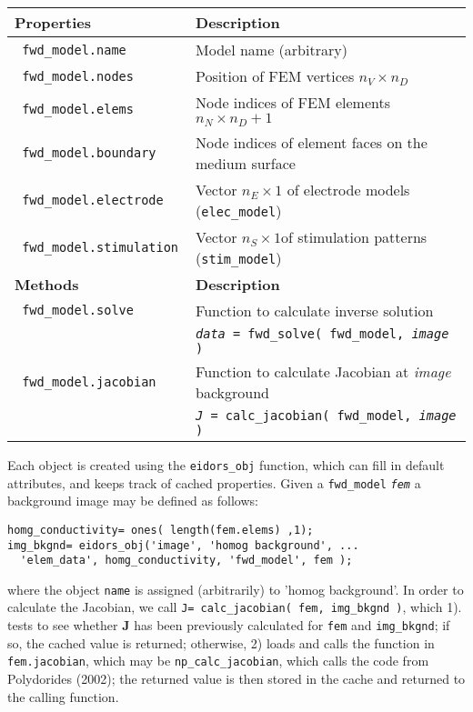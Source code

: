 \documentclass[12pt]{iopart}
\begin{document}
\begin{tabular}{ll}
{\bf Properties} & {\bf Description } \\
\hline
{\tt
        fwd\_model.name
} &
        Model name (arbitrary)
\\
{\tt
        fwd\_model.nodes
} &
        Position of FEM vertices
        $n_V{\times}n_D$
\\
{\tt
        fwd\_model.elems
} &
        Node indices of FEM elements
        $n_N{\times}n_D+1$
\\
{\tt
        fwd\_model.boundary
} &
        Node indices of element faces on the medium surface
\\
{\tt
        fwd\_model.electrode
} &
        Vector $n_E{\times}1$
           of electrode models ({\tt elec\_model})
\\
{\tt
        fwd\_model.stimulation
} &
         Vector $n_S{\times}1$of stimulation
            patterns ({\tt stim\_model})
\\
\hline
{\bf Methods} & {\bf Description } \\
\hline
{\tt
        fwd\_model.solve
} &
        Function to calculate inverse solution
\\ &
        {\tt {\em data} = fwd\_solve( fwd\_model, {\em image} )}
\\
{\tt
        fwd\_model.jacobian
} &
        Function to calculate Jacobian at {\em image} background
\\ &
        {\tt {\em J} = calc\_jacobian( fwd\_model, {\em image} )}
\\
\end{tabular}


Each object is created using the {\tt eidors\_obj}
function, which can fill in default attributes, and 
keeps track of cached properties.
Given a {\tt fwd\_model} {\tt\em fem}
a background image may be defined as follows:
\begin{verbatim}
homg_conductivity= ones( length(fem.elems) ,1);
img_bkgnd= eidors_obj('image', 'homog background', ...
  'elem_data', homg_conductivity, 'fwd_model', fem );
\end{verbatim}
where the object {\tt name} is assigned
(arbitrarily) to 'homog background'.
In order to calculate the Jacobian, we call
{\tt J= calc\_jacobian( fem, img\_bkgnd )}, which
1). tests to see whether {\bf J} has been previously
calculated for {\tt fem} and {\tt img\_bkgnd}; if
so, the cached value is returned; otherwise,
2) loads and calls the function in {\tt fem.jacobian},
which may be {\tt np\_calc\_jacobian}, which 
calls the code from Polydorides (2002); the returned
value is then stored in the cache and returned to the
calling function.
\end{document}
